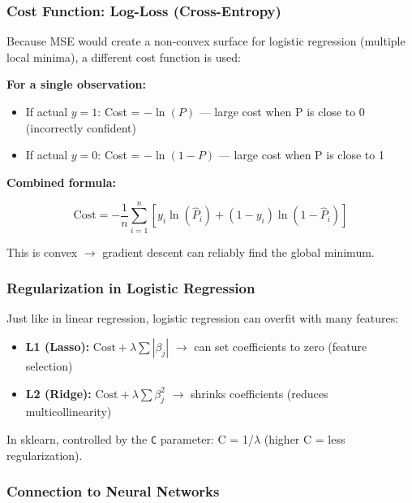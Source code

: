 \documentclass[12pt,openany]{book}
\begin{document}
\subsubsection{Cost Function: Log-Loss (Cross-Entropy)}


Because MSE would create a non-convex surface for logistic regression (multiple local minima), a different cost function is used:

\textbf{For a single observation:}
\begin{itemize}[leftmargin=*]
    \item If actual \(y = 1\): Cost = \(-\ln(P)\) --- large cost when P is close to 0 (incorrectly confident)
    \item If actual \(y = 0\): Cost = \(-\ln(1 - P)\) --- large cost when P is close to 1

\end{itemize}

\textbf{Combined formula:}

\[
\text{Cost} = -\frac{1}{n}\sum_{i=1}^{n}\left[y_i \ln(\hat{P}_i) + (1-y_i)\ln(1-\hat{P}_i)\right]
\]


This is convex \(\rightarrow\) gradient descent can reliably find the global minimum.

\subsubsection{Regularization in Logistic Regression}


Just like in linear regression, logistic regression can overfit with many features:

\begin{itemize}[leftmargin=*]
    \item \textbf{L1 (Lasso):} \(\text{Cost} + \lambda\sum|\beta_j|\) \(\rightarrow\) can set coefficients to zero (feature selection)
    \item \textbf{L2 (Ridge):} \(\text{Cost} + \lambda\sum\beta_j^2\) \(\rightarrow\) shrinks coefficients (reduces multicollinearity)

\end{itemize}

In sklearn, controlled by the \texttt{C} parameter: C = 1/\(\lambda\) (higher C = less regularization).

\subsubsection{Connection to Neural Networks}
\end{document}
